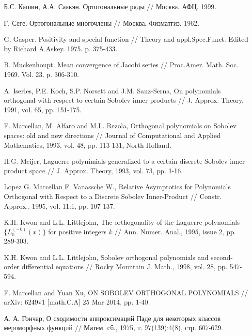 \begin{thebibliography}{1}
 Б.С. Кашин, А.А. Саакян. Ортогональные ряды // Москва. АФЦ. 1999.

 Г. Сеге. Ортогональные многочлены // Москва. Физматгиз. 1962.

 G. Gasper. Positivity and special function // Theory and appl.Spec.Funct. Edited by Richard A.Askey. 1975. p. 375-433.

 B. Muckenhoupt. Mean convergence of Jacobi series // Proc.Amer. Math. Soc. 1969. Vol. 23.  p. 306-310.



 A. Iserles, P.E. Koch, S.P. Norsett and J.M. Sanz-Serna, On polynomials  orthogonal  with respect  to certain Sobolev inner products // J. Approx. Theory, 1991, vol. 65, pp. 151-175.



 F. Marcellan, M. Alfaro and M.L. Rezola, Orthogonal polynomials on Sobolev spaces: old and new directions // Journal of Computational and Applied Mathematics, 1993, vol. 48, pp. 113-131, North-Holland.


 H.G. Meijer, Laguerre polynimials generalized to a certain discrete Sobolev inner product space // J. Approx. Theory, 1993, vol. 73, pp. 1-16.

 Lopez G. Marcellan F. Vanassche W., Relative Asymptotics for Polynomials Orthogonal with Respect to a Discrete Sobolev Inner-Product // Constr. Approx., 1995, vol. 11:1, pp. 107-137.

 K.H. Kwon and L.L. Littlejohn, The orthogonality of the Laguerre polynomials $\{L_n^{(-k)}(x)\}$ for positive integers $k$ // Ann. Numer. Anal., 1995, issue 2, pp. 289-303.

 K.H. Kwon and L.L. Littlejohn, Sobolev orthogonal polynomials and second-order differential equations // Rocky Mountain J. Math., 1998, vol. 28, pp. 547-594.

 F. Marcellan and Yuan Xu, ON SOBOLEV ORTHOGONAL POLYNOMIALS // arXiv: 6249v1 [math.C.A] 25 Mar 2014, pp. 1-40.


 А. А. Гончар, О сходимости аппроксимаций Паде для некоторых классов мероморфных функций // Матем. сб., 1975, т. 97(139):4(8), стр. 607-629.




\end{thebibliography}
